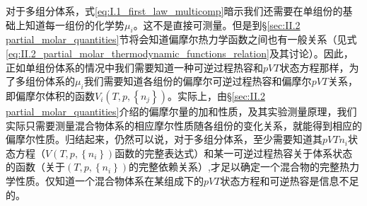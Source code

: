\documentclass[main.tex]{subfiles}
\begin{document}
对于多组分体系，式\eqref{eq:I.1_first_law_multicomp}暗示我们还需要在单组份的基础上知道每一组份的化学势$\mu_i$。这不是直接可测量。但是到\S\ref{sec:II.2 partial_molar_quantities}节将会知道偏摩尔热力学函数之间也有一般关系（见式\eqref{eq:II.2_partial_molar_thermodynamic_functions_relation}及其讨论）。因此，正如单组份体系的情况中我们需要知道一种可逆过程热容和$pVT$状态方程那样，为了多组份体系的$\mu_i$我们需要知道各组份的偏摩尔可逆过程热容和偏摩尔$pVT$关系，即偏摩尔体积的函数$V_i\left(T,p,\left\{n_j\right\}\right)$。实际上，由\S\ref{sec:II.2 partial_molar_quantities}介绍的偏摩尔量的加和性质，及其实验测量原理，我们实际只需要测量混合物体系的相应摩尔性质随各组份的变化关系，就能得到相应的偏摩尔性质。归结起来，仍然可以说，对于多组分体系，至少需要知道其$pVTn_i$状态方程（$V\left(T,p,\left\{n_i\right\}\right)$函数的完整表达式）和某一可逆过程热容关于体系状态的函数（关于$\left(T,p,\left\{n_i\right\}\right)$的完整依赖关系）,才足以确定一个混合物的完整热力学性质。仅知道一个混合物体系在某组成下的$pVT$状态方程和可逆热容是信息不足的。
\end{document}
